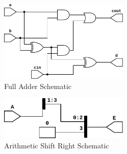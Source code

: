 \documentclass{article}
\begin{document}
\begin{figure}[H]
  \begin{center}
    \includegraphics[width=0.55\textwidth]{figures/FullAdder.pdf}
  \end{center}
  \caption{Full Adder Schematic}
\end{figure}

\begin{figure}[H]
  \begin{center}
    \includegraphics[width=0.55\textwidth]{figures/ASR.pdf}
  \end{center}
  \caption{Arithmetic Shift Right Schematic}
\end{figure}
\end{document}
